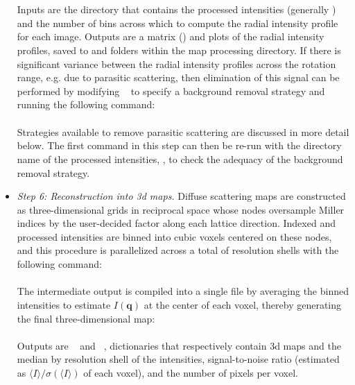 \documentclass{article}
\begin{document}
\begin{itemize}
\\[0.2cm]
\texttt{ }
\\[0.2cm]
Inputs are the directory that contains the processed intensities (generally \texttt{}) and the number of bins across which to compute the radial intensity profile for each image. Outputs are a matrix (\texttt{}) and plots of the radial intensity profiles, saved to \texttt{} and  \texttt{} folders within the map processing directory. If there is significant variance between the radial intensity profiles across the rotation range, e.g. due to parasitic scattering, then elimination of this signal can be performed by modifying \texttt{ } to specify a background removal strategy and running the following command:
\\[0.2cm]
\texttt{ }
\\[0.2cm]
Strategies available to remove parasitic scattering are discussed in more detail below. The first command in this step can then be re-run with the directory name of the processed intensities, \texttt{}, to check the adequacy of the background removal strategy.
%
\item \emph{Step 6: Reconstruction into 3d maps.}
Diffuse scattering maps are constructed as three-dimensional grids in reciprocal space whose nodes oversample Miller indices by the user-decided factor along each lattice direction. Indexed and processed intensities are binned into cubic voxels centered on these nodes, and this procedure is parallelized across a total of \texttt{} resolution shells with the following command:
\\[0.2cm]
\texttt{ }
\\[0.2cm]
The intermediate output is compiled into a single file by averaging the binned intensities to estimate $I(\mathbf{q})$ at the center of each voxel, thereby generating the final three-dimensional map:
\\[0.2cm]
\texttt{ }
\\[0.2cm]
Outputs are \texttt{ } and \texttt{ }, dictionaries that respectively contain 3d maps and the median by resolution shell of the intensities, signal-to-noise ratio (estimated as $\langle I \rangle / \sigma(\langle I \rangle)$ of each voxel), and the number of pixels per voxel.

\end{itemize}
\end{document}
